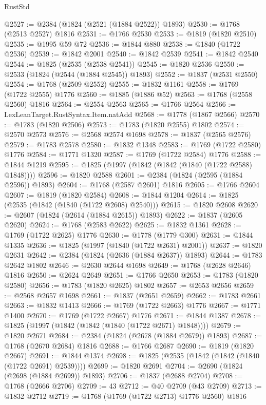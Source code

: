 \begin{lexlean}{RustStd}
\begin{coremodule}
{\begin{coremodule}
{{{{{{{{{{{{{{{{{{{{{{{{{{{{{{{{{{{{{{{{{{{{{{{@2527 := @2384 (@1824 (@2521 (@1884 @2522)) @1893)
@2530 := @1768 (@2513 @2527) @1816
@2531 := @1766 @2530
@2533 := @1819 (@1820 @2510)
@2535 := @1995 @59 @72
@2536 := @1844 @880
@2538 := @1840 (@1722 @2536)
@2539 := @1842 @2001
@2540 := @1842 @2539
@2541 := @1842 @2540
@2544 := @1825 (@2535 (@2538 @2541))
@2545 := @1820 @2536
@2550 := @2533 (@1824 (@2544 (@1884 @2545)) @1893)
@2552 := @1837 (@2531 @2550)
@2554 := @1768 (@2509 @2552)
@2555 := @1832 @1161
@2558 := @1769 (@1722 @2555) @1776
@2560 := @1885 (@1886 @52)
@2563 := @1768 (@2558 @2560) @1816
@2564 := @2554 @2563
@2565 := @1766 @2564
@2566 := LexLeanTarget.RustSyntax.Item.natAdd
@2568 := @1778 (@1867 @2566)
@2570 := @1783 (@1820 @2506)
@2573 := @1783 (@1820 @2555) @1802
@2574 := @2570 @2573
@2576 := @2568 @2574 @1698
@2578 := @1837 (@2565 @2576)
@2579 := @1783 @2578
@2580 := @1832 @1348
@2583 := @1769 (@1722 @2580) @1776
@2584 := @1771 @1320
@2587 := @1769 (@1722 @2584) @1776
@2588 := @1844 @1219
@2595 := @1825 (@1997 (@1842 (@1842 (@1840 (@1722 @2588) @1848))))
@2596 := @1820 @2588
@2601 := @2384 (@1824 (@2595 (@1884 @2596)) @1893)
@2604 := @1768 (@2587 @2601) @1816
@2605 := @1766 @2604
@2607 := @1819 (@1820 @2584)
@2608 := @1844 @1204
@2614 := @1825 (@2535 (@1842 (@1840 (@1722 @2608) @2540)))
@2615 := @1820 @2608
@2620 := @2607 (@1824 (@2614 (@1884 @2615)) @1893)
@2622 := @1837 (@2605 @2620)
@2624 := @1768 (@2583 @2622)
@2625 := @1832 @1361
@2628 := @1769 (@1722 @2625) @1776
@2630 := @1778 (@1779 @300)
@2631 := @1844 @1335
@2636 := @1825 (@1997 (@1840 (@1722 @2631) @2001))
@2637 := @1820 @2631
@2642 := @2384 (@1824 (@2636 (@1884 @2637)) @1893)
@2644 := @1783 @2642 @1802
@2646 := @2630 @2644 @1698
@2649 := @1768 (@2628 @2646) @1816
@2650 := @2624 @2649
@2651 := @1766 @2650
@2653 := @1783 (@1820 @2580)
@2656 := @1783 (@1820 @2625) @1802
@2657 := @2653 @2656
@2659 := @2568 @2657 @1698
@2661 := @1837 (@2651 @2659)
@2662 := @1783 @2661
@2663 := @1832 @1413
@2666 := @1769 (@1722 @2663) @1776
@2667 := @1771 @1400
@2670 := @1769 (@1722 @2667) @1776
@2671 := @1844 @1387
@2678 := @1825 (@1997 (@1842 (@1842 (@1840 (@1722 @2671) @1848))))
@2679 := @1820 @2671
@2684 := @2384 (@1824 (@2678 (@1884 @2679)) @1893)
@2687 := @1768 (@2670 @2684) @1816
@2688 := @1766 @2687
@2690 := @1819 (@1820 @2667)
@2691 := @1844 @1374
@2698 := @1825 (@2535 (@1842 (@1842 (@1840 (@1722 @2691) @2539))))
@2699 := @1820 @2691
@2704 := @2690 (@1824 (@2698 (@1884 @2699)) @1893)
@2706 := @1837 (@2688 @2704)
@2708 := @1768 (@2666 @2706)
@2709 := 43
@2712 := @40 @2709 (@43 @2709)
@2713 := @1832 @2712
@2719 := @1768 (@1769 (@1722 @2713) @1776 @2560) @1816
}}}}}}}}}}}}}}}}}}}}}}}}}}}}}}}}}}}}}}}}}}}}}}}
\end{coremodule}}
\end{coremodule}
\end{lexlean}
